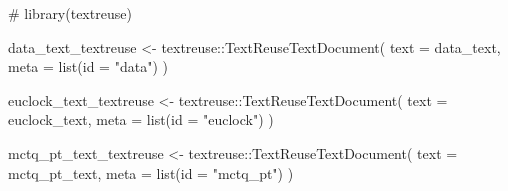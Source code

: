 \documentclass[
  12pt,
  a4paper,
  oneside]{tesesusp}
\newenvironment{Shaded}{\begin{snugshade}}{\end{snugshade}}
\newcommand{\AttributeTok}[1]{\textcolor[rgb]{0.40,0.45,0.13}{#1}}
\newcommand{\CommentTok}[1]{\textcolor[rgb]{0.37,0.37,0.37}{#1}}
\newcommand{\FunctionTok}[1]{\textcolor[rgb]{0.28,0.35,0.67}{#1}}
\newcommand{\NormalTok}[1]{\textcolor[rgb]{0.00,0.23,0.31}{#1}}
\newcommand{\OtherTok}[1]{\textcolor[rgb]{0.00,0.23,0.31}{#1}}
\newcommand{\SpecialCharTok}[1]{\textcolor[rgb]{0.37,0.37,0.37}{#1}}
\newcommand{\StringTok}[1]{\textcolor[rgb]{0.13,0.47,0.30}{#1}}
\begin{document}
\begin{Shaded}
\begin{Highlighting}[numbers=left,,]
\CommentTok{\# library(textreuse)}

\NormalTok{data\_text\_textreuse }\OtherTok{\textless{}{-}} 
\NormalTok{  textreuse}\SpecialCharTok{::}\FunctionTok{TextReuseTextDocument}\NormalTok{(}
    \AttributeTok{text =}\NormalTok{ data\_text,}
    \AttributeTok{meta =} \FunctionTok{list}\NormalTok{(}\AttributeTok{id =} \StringTok{"data"}\NormalTok{)}
\NormalTok{  )}

\NormalTok{euclock\_text\_textreuse }\OtherTok{\textless{}{-}} 
\NormalTok{  textreuse}\SpecialCharTok{::}\FunctionTok{TextReuseTextDocument}\NormalTok{(}
    \AttributeTok{text =}\NormalTok{ euclock\_text,}
    \AttributeTok{meta =} \FunctionTok{list}\NormalTok{(}\AttributeTok{id =} \StringTok{"euclock"}\NormalTok{)}
\NormalTok{  )}

\NormalTok{mctq\_pt\_text\_textreuse }\OtherTok{\textless{}{-}} 
\NormalTok{  textreuse}\SpecialCharTok{::}\FunctionTok{TextReuseTextDocument}\NormalTok{(}
    \AttributeTok{text =}\NormalTok{ mctq\_pt\_text,}
    \AttributeTok{meta =} \FunctionTok{list}\NormalTok{(}\AttributeTok{id =} \StringTok{"mctq\_pt"}\NormalTok{)}
\NormalTok{  )}
\end{Highlighting}
\end{Shaded}
\end{document}
